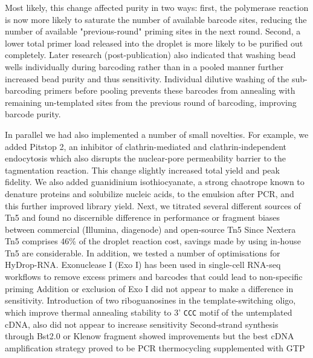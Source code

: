 Most likely, this change affected purity in two ways: first, the polymerase reaction is now more likely to saturate the number of available barcode sites, reducing the number of available "previous-round" priming sites in the next round. Second, a lower total primer load released into the droplet is more likely to be purified out completely. Later research (post-publication) also indicated that washing bead wells individually during barcoding rather than in a pooled manner further increased bead purity and thus sensitivity. Individual dilutive washing of the sub-barcoding primers before pooling prevents these barcodes from annealing with remaining un-templated sites from the previous round of barcoding, improving barcode purity.

In parallel we had also implemented a number of small novelties. For example, we added Pitstop 2, an inhibitor of clathrin-mediated and clathrin-independent endocytosis which also disrupts the nuclear-pore permeability barrier to the tagmentation reaction. This change slightly increased total yield and peak fidelity. We also added guanidinium isothiocyanate, a strong chaotrope known to denature proteins and solubilize nucleic acids, to the emulsion after PCR, and this further improved library yield. Next, we titrated several different sources of Tn5 and found no discernible difference in performance or fragment biases between commercial (Illumina, diagenode) and open-source Tn5 Since Nextera Tn5 comprises 46\% of the droplet reaction cost, savings made by using in-house Tn5 are considerable. In addition, we tested a number of optimisations for HyDrop-RNA. Exonuclease I (Exo I) has been used in single-cell RNA-seq workflows to remove excess primers and barcodes that could lead to non-specific priming Addition or exclusion of Exo I did not appear to make a difference in sensitivity. Introduction of two riboguanosines in the template-switching oligo, which improve thermal annealing stability to 3' \verb|CCC| motif of the untemplated cDNA, also did not appear to increase sensitivity Second-strand synthesis through Bst2.0 or Klenow fragment showed improvements but the best cDNA amplification strategy proved to be PCR thermocycling supplemented with GTP

